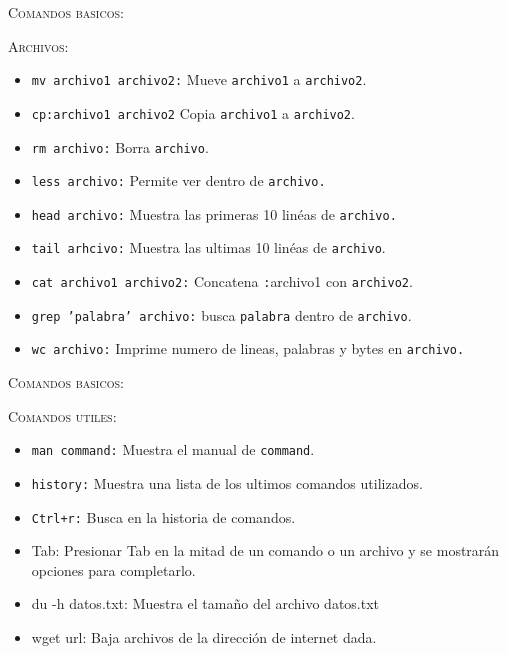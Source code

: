 \documentclass{beamer}
\begin{document}
\begin{frame}{\textsc{Comandos basicos:}}

\begin{center}
{\large \textsc{Archivos:}}
\end{center}

\begin{itemize}
\item \texttt{mv archivo1 archivo2:} \textrm{Mueve} \texttt{archivo1} \textrm{a} \texttt{archivo2}.
\item \texttt{cp:archivo1 archivo2} \textrm{Copia} \texttt{archivo1} \textrm{a} \texttt{archivo2}.
\item \texttt{rm archivo:} \textrm{Borra} \texttt{archivo}.
\item \texttt{less archivo:} \textrm{Permite ver dentro de} \texttt{archivo.}
\item \texttt{head archivo:} \textrm{Muestra las primeras 10 lin\'eas de} \texttt{archivo.}
\item \texttt{tail arhcivo:} \textrm{Muestra las ultimas 10 lin\'eas de} \texttt{archivo}.
\item \texttt{cat archivo1 archivo2:} \textrm{Concatena} \texttt:{archivo1} \textrm{con} \texttt{archivo2}.
\item \texttt{grep 'palabra' archivo:} \textrm{busca} \texttt{palabra} \textrm{dentro de} \texttt{archivo}.
\item \texttt{wc archivo:} \textrm{Imprime numero de lineas, palabras y bytes en} \texttt{archivo.}
\end{itemize}
\end{frame}



\begin{frame}{\textsc{Comandos basicos:}}

\begin{center}
{\large \textsc{Comandos utiles:}}
\end{center}

\begin{itemize}
\item \texttt{man command:} \textrm{Muestra el manual de} \texttt{command}.
\item \texttt{history:} \textrm{Muestra una lista de los ultimos comandos utilizados.}
\item \texttt{Ctrl+r:} \textrm{Busca en la historia de comandos.}
\item \textrm{Tab:} \textrm{Presionar Tab en la mitad de un comando o un archivo y se mostrar\'an opciones para completarlo.}
\item \textrm{du -h datos.txt:} \textrm{Muestra el tama\~no del archivo datos.txt}
\item \textrm{wget url:} \textrm{Baja archivos de la direcci\'on de internet dada.} 
\end{itemize}

\end{frame}
\end{document}
